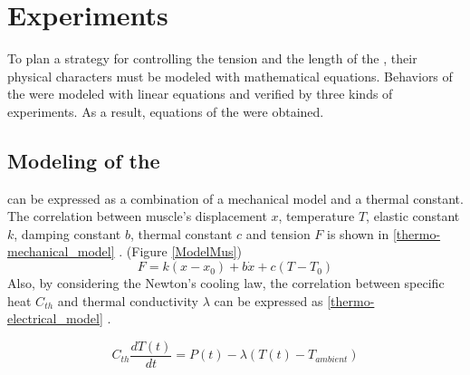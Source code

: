 \section{Experiments}\label{section_modeling}
To plan a strategy for controlling the tension and the length of the \scpsnospace, their physical characters must be modeled with mathematical equations. Behaviors of the \scps were modeled with linear equations and verified by three kinds of experiments. As a result, equations of the \anta were obtained.

\subsection{Modeling of the \ANTA}\label{section_thermo_model}
\scp can be expressed as a combination of a mechanical model and a thermal constant. The correlation between muscle's displacement $x$, temperature $T$, elastic constant $k$, damping constant $b$, thermal constant $c$ and tension $F$ is shown in \eqref{thermo-mechanical_model} \cite{yip}.
(Figure \ref{ModelMus})
\begin{equation} \label{thermo-mechanical_model}
F=k(x-x_0) + b\dot{x}+c(T-T_0)
\end{equation}
Also, by considering the Newton's cooling law, the correlation between specific heat $C_{th}$ and thermal conductivity $\lambda$ can be expressed as \eqref{thermo-electrical_model} \cite{yip}.

\begin{equation} \label{thermo-electrical_model}
C_{th}\frac{dT(t)}{dt} = P(t) - \lambda(T(t)-T_{ambient})
\end{equation}

